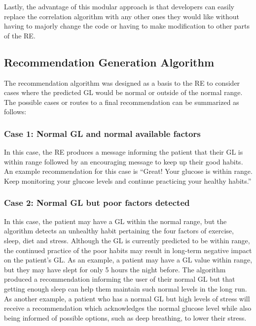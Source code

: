 Lastly, the advantage of this modular approach is that developers can easily replace the correlation algorithm with any other ones they would like without having to majorly change the code or having to make modification to other parts of the RE.



\subsection{Recommendation Generation Algorithm}
\label{subsec:recommendation_generation_algorithm}

The recommendation algorithm was designed as a basis to the RE to consider cases where the predicted GL would be normal or outside of the normal range. The possible cases or routes to a final recommendation can be summarized as follows:

\subsubsection{Case 1: Normal GL and normal available factors}
In this case, the RE produces a message informing the patient that their GL is within range followed by an encouraging message to keep up their good habits. An example recommendation for this case is “Great! Your glucose is within range. Keep monitoring your glucose levels and continue practicing your healthy habits.”

\subsubsection{Case 2: Normal GL but poor factors detected}
In this case, the patient may have a GL within the normal range, but the algorithm detects an unhealthy habit pertaining the four factors of exercise, sleep, diet and stress. Although the GL is currently predicted to be within range, the continued practice of the poor habits may result in long-term negative impact on the patient’s GL. As an example, a patient may have a GL value within range, but they may have slept for only 5 hours the night before. The algorithm produced a recommendation informing the user of their normal GL but that getting enough sleep can help them maintain such normal levels in the long run. As another example, a patient who has a normal GL but high levels of stress will receive a recommendation which acknowledges the normal glucose level while also being informed of possible options, such as deep breathing, to lower their stress.

